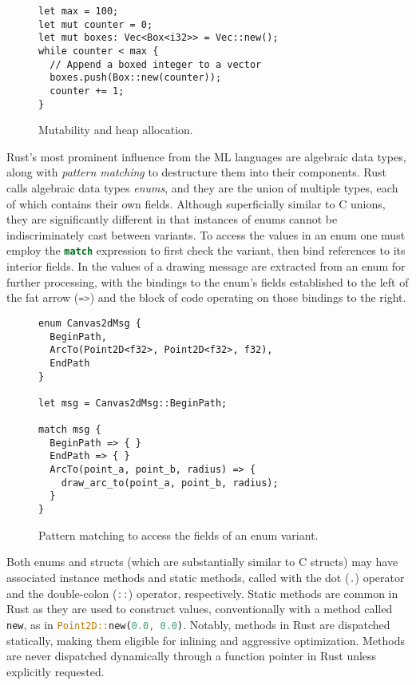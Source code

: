 \begin{figure}
\begin{lstlisting}
let max = 100;
let mut counter = 0;
let mut boxes: Vec<Box<i32>> = Vec::new();
while counter < max {
  // Append a boxed integer to a vector
  boxes.push(Box::new(counter));
  counter += 1;
}
\end{lstlisting}
  \caption{Mutability and heap allocation.}
  \label{fig:mut}
\end{figure}

Rust's most prominent influence from the ML languages are algebraic data types,
along with \emph{pattern matching} to destructure
them into their components. Rust calls algebraic data types \emph{enums},
and they are the union of multiple types,
each of which contains their own fields. Although superficially
similar to C unions, they are significantly different in that
instances of enums cannot be indiscriminately cast between
variants.
To access the values in an enum one must employ the \lstinline[language=Rust]{match}
expression to first check the variant, then bind references
to its interior fields. In  the values of
a drawing message are extracted from an enum for further processing,
with the bindings to the enum's fields established to the left of the
fat arrow (\lstinline[language=Rust]{=>}) and the block of code operating
on those bindings to the right.

\begin{figure}
\begin{lstlisting}
enum Canvas2dMsg {
  BeginPath,
  ArcTo(Point2D<f32>, Point2D<f32>, f32),
  EndPath
}

let msg = Canvas2dMsg::BeginPath;

match msg {
  BeginPath => { }
  EndPath => { }
  ArcTo(point_a, point_b, radius) => {
    draw_arc_to(point_a, point_b, radius);
  }
}
\end{lstlisting}
  \caption{Pattern matching to access the fields of an enum variant.}
  \label{fig:enums}
\end{figure}

Both enums and structs (which are substantially similar to C structs)
may have associated instance methods and static methods, called with the dot
(\lstinline[language=Rust]{.}) operator and the double-colon
(\lstinline[language=Rust]{::}) operator, respectively.
Static methods are common in Rust as they are used to construct
values, conventionally with a method called
\lstinline[language=Rust]{new}, as in
\lstinline[language=Rust]{Point2D::new(0.0, 0.0)}.
Notably, methods in Rust are dispatched statically, making them
eligible for inlining and aggressive optimization.
Methods are never dispatched dynamically through a function pointer in Rust
unless explicitly requested.

